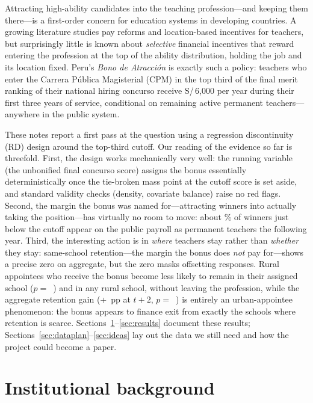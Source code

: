 \documentclass[11pt]{article}
\begin{document}
Attracting high-ability candidates into the teaching profession---and keeping
them there---is a first-order concern for education systems in developing
countries. A growing literature studies pay reforms and location-based
incentives for teachers, but surprisingly little is known about
\emph{selective} financial incentives that reward entering the profession at
the top of the ability distribution, holding the job and its location fixed.
Peru's \emph{Bono de Atracci\'on} is exactly such a policy: teachers who enter
the Carrera P\'ublica Magisterial (CPM) in the top third of the final merit
ranking of their national hiring concurso receive S/\,6,000 per year during
their first three years of service, conditional on remaining active permanent
teachers---anywhere in the public system.

These notes report a first pass at the question using a regression
discontinuity (RD) design around the top-third cutoff. Our reading of the
evidence so far is threefold. First, the design works mechanically very well:
the running variable (the unbonified final concurso score) assigns the bonus
essentially deterministically once the tie-broken mass point at the cutoff
score is set aside, and standard validity checks (density, covariate balance)
raise no red flags. Second, the margin the bonus was named for---attracting
winners into actually taking the position---has virtually no room to move:
about \AcceptMean\% of winners just below the cutoff appear on the public
payroll as permanent teachers the following year. Third, the interesting
action is in \emph{where} teachers stay rather than \emph{whether} they
stay: same-school retention---the margin the bonus does \emph{not} pay
for---shows a precise zero on aggregate, but the zero masks offsetting
responses. Rural appointees who receive the bonus become less likely to
remain in their assigned school ($p=$~\RuralSameschP) and in any rural
school, without leaving the profession, while the aggregate retention gain
(+\UrbanRetainRF~pp at $t+2$, $p=$~\UrbanRetainP) is entirely an
urban-appointee phenomenon: the bonus appears to finance exit from exactly
the schools where retention is scarce.
Sections~\ref{sec:institutions}--\ref{sec:results} document
these results; Sections~\ref{sec:dataplan}--\ref{sec:ideas} lay out the data
we still need and how the project could become a paper.

\section{Institutional background}\label{sec:institutions}
\end{document}
